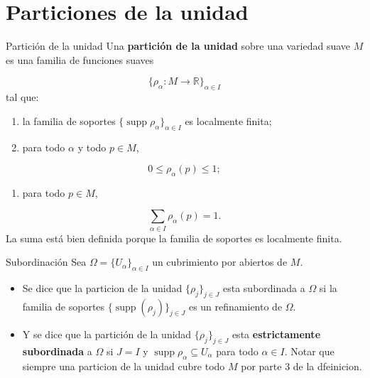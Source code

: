 \section{Particiones de la unidad}
\begin{bookdefinition}{Partición de la unidad}
Una \textbf{partición de la unidad} sobre una variedad suave $M$ es una familia de funciones suaves

\[
\{\rho_\alpha:M\to\mathbb R\}_{\alpha\in I}
\]
tal que:

\begin{enumerate}
\item la familia de soportes $\{\operatorname{supp}\rho_\alpha\}_{\alpha\in I}$ es localmente finita;
\item para todo $\alpha$ y todo $p\in M$,
\end{enumerate}
\[
0\le \rho_\alpha(p)\le 1;
\]
\begin{enumerate}[start=3]
\item para todo $p\in M$,
\end{enumerate}
\[
\sum_{\alpha\in I}\rho_\alpha(p)=1.
\]
La suma está bien definida porque la familia de soportes es localmente finita.

\end{bookdefinition}
\label{blk:f5db1b}
\begin{bookdefinition}{Subordinación}
Sea $\Omega=\{U_\alpha\}_{\alpha\in I}$ un cubrimiento por abiertos de $M$.

\begin{itemize}
\item Se dice que la particion de la unidad $\{\rho_j\}_{j\in J}$ esta subordinada a $\Omega$ si la familia de soportes $\{ \operatorname{supp}(\rho_j) \}_{j\in J}$ es un refinamiento de $\Omega$.
\item Y se dice que la partición de la unidad $\{\rho_j\}_{j\in J}$ esta \textbf{estrictamente subordinada} a $\Omega$ si $J=I$ y $\operatorname{supp}\rho_\alpha\subseteq U_\alpha$ para todo $\alpha\in I$. Notar que siempre una particion de la unidad cubre todo $M$ por parte 3 de la dfeinicion.
\end{itemize}
\end{bookdefinition}
\label{blk:12d7c6}
